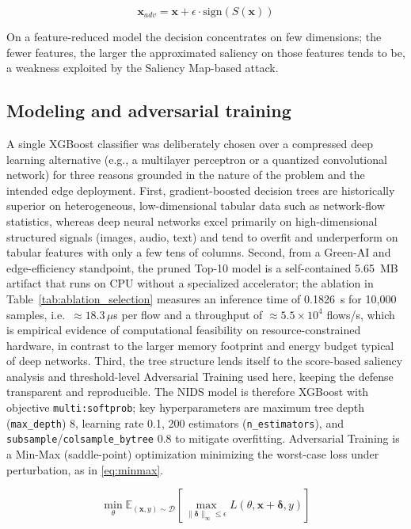 \documentclass{iaesarticle}
\begin{document}
\begin{equation}\label{eq:fgsm}
\mathbf{x}_{adv} = \mathbf{x} + \epsilon \cdot \text{sign}\left( S(\mathbf{x}) \right)
\end{equation}

On a feature-reduced model the decision concentrates on few dimensions; the fewer features, the larger the approximated saliency on those features tends to be, a weakness exploited by the Saliency Map-based attack.

\subsection{Modeling and adversarial training}
A single XGBoost classifier was deliberately chosen over a compressed deep learning alternative (e.g., a multilayer perceptron or a quantized convolutional network) for three reasons grounded in the nature of the problem and the intended edge deployment. First, gradient-boosted decision trees are historically superior on heterogeneous, low-dimensional tabular data such as network-flow statistics, whereas deep neural networks excel primarily on high-dimensional structured signals (images, audio, text) and tend to overfit and underperform on tabular features with only a few tens of columns. Second, from a Green-AI and edge-efficiency standpoint, the pruned Top-10 model is a self-contained 5.65~MB artifact that runs on CPU without a specialized accelerator; the ablation in Table~\ref{tab:ablation_selection} measures an inference time of 0.1826~s for 10{,}000 samples, i.e.\ $\approx18.3\,\mu$s per flow and a throughput of $\approx5.5\times10^{4}$ flows/s, which is empirical evidence of computational feasibility on resource-constrained hardware, in contrast to the larger memory footprint and energy budget typical of deep networks. Third, the tree structure lends itself to the score-based saliency analysis and threshold-level Adversarial Training used here, keeping the defense transparent and reproducible. The NIDS model is therefore XGBoost with objective \texttt{multi:softprob}; key hyperparameters are maximum tree depth (\texttt{max\_depth}) 8, learning rate 0.1, 200 estimators (\texttt{n\_estimators}), and \texttt{subsample}/\texttt{colsample\_bytree} 0.8 to mitigate overfitting. Adversarial Training is a Min-Max (saddle-point) optimization \cite{52} minimizing the worst-case loss under perturbation, as in \eqref{eq:minmax}.

\begin{equation}\label{eq:minmax}
\min_{\theta} \mathbb{E}_{(\mathbf{x}, y) \sim \mathcal{D}} \left[ \max_{\|\boldsymbol{\delta}\|_\infty \le \epsilon} L(\theta, \mathbf{x} + \boldsymbol{\delta}, y) \right]
\end{equation}
\end{document}
